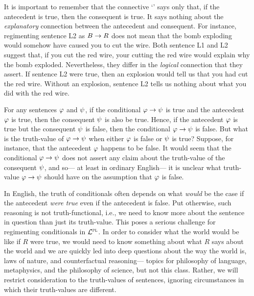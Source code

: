 It is important to remember that the connective `\eif' says only that, if the antecedent is true, then the consequent is true.
It says nothing about the \emph{explanatory} connection between the antecedent and consequent.
For instance, regimenting sentence L2 as $B \rightarrow R$ does not mean that the bomb exploding would somehow have caused you to cut the wire.
Both sentence L1 and L2 suggest that, if you cut the red wire, your cutting the red wire would explain why the bomb exploded.
Nevertheless, they differ in the \textit{logical} connection that they assert.
If sentence L2 were true, then an explosion would tell us that you had cut the red wire.
Without an explosion, sentence L2 tells us nothing about what you did with the red wire.



For any sentences $\varphi$ and $\psi$, if the conditional $\varphi \rightarrow \psi$ is true and the antecedent $\varphi$ is true, then the consequent $\psi$ is also be true.
Hence, if the antecedent $\varphi$ is true but the consequent $\psi$ is false, then the conditional $\varphi \rightarrow \psi$ is false.
But what is the truth-value of $\varphi \rightarrow \psi$ when either $\varphi$ is false or $\psi$ is true?
Suppose, for instance, that the antecedent $\varphi$ happens to be false.
It would seem that the conditional $\varphi \rightarrow \psi$ does not assert any claim about the truth-value of the consequent $\psi$, and so--- at least in ordinary English--- it is unclear what truth-value $\varphi \rightarrow \psi$ should have on the assumption that $\varphi$ is false.  

In English, the truth of conditionals often depends on what \emph{would} be the case if the antecedent \emph{were true} even if the antecedent is false.
Put otherwise, such reasoning is not truth-functional, i.e., we need to know more about the sentence in question than just its truth-value.
This poses a serious challenge for regimenting conditionals in $\mathcal{L}^{\textsc{pl}}$.
In order to consider what the world would be like if $R$ were true, we would need to know something about what $R$ says about the world and we are quickly led into deep questions about the way the world is, laws of nature, and counterfactual reasoning--- topics for philosophy of language, metaphysics, and the philosophy of science, but not this class.
Rather, we will restrict consideration to the truth-values of sentences, ignoring circumstances in which their truth-values are different.


